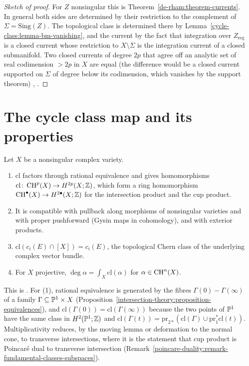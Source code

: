 \begin{proof}[Sketch of proof]
For $Z$ nonsingular this is Theorem~\ref{de-rham:theorem-currents}. In general both sides are determined by their restriction to the complement of $\Sigma = \mathrm{Sing}(Z)$. The
topological class is determined there by Lemma~\ref{cycle-class:lemma-bm-vanishing}, and the current by the fact that integration over $Z_{\mathrm{reg}}$ is a closed current whose
restriction to $X \setminus \Sigma$ is the integration current of a closed submanifold. Two closed currents of degree $2p$ that agree off an analytic set of real codimension
$> 2p$ in $X$ are equal (the difference would be a closed current supported on $\Sigma$ of degree below its codimension, which vanishes by the support theorem) \cite[Chapter 3]{griffiths-harris},
\cite[Section 11.1]{voisin-hodge-1}.
\end{proof}

\section{The cycle class map and its properties}\label{cycle-class:section-properties}

\begin{theorem}\label{cycle-class:theorem-cycle-class}
Let $X$ be a nonsingular complex variety.
\begin{enumerate}
\item $\mathrm{cl}$ factors through rational equivalence and gives homomorphisms $\mathrm{cl} \colon \operatorname{CH}^p(X) \to H^{2p}(X; \mathbb{Z})$, which form a ring homomorphism
$\operatorname{CH}^\bullet(X) \to H^{2\bullet}(X; \mathbb{Z})$ for the intersection product and the cup product.
\item It is compatible with pullback along morphisms of nonsingular varieties and with proper pushforward (Gysin maps in cohomology), and with exterior products.
\item $\mathrm{cl}(c_i(E) \cap [X]) = c_i(E)$, the topological Chern class of the underlying complex vector bundle.
\item For $X$ projective, $\deg\alpha = \int_X\mathrm{cl}(\alpha)$ for $\alpha \in \operatorname{CH}^n(X)$.
\end{enumerate}
\end{theorem}

This is \cite[Chapter 19]{fulton-intersection}. For (1), rational equivalence is generated by the fibres $\Gamma(0) - \Gamma(\infty)$ of a family
$\Gamma \subseteq \mathbb{P}^1 \times X$ (Proposition~\ref{intersection-theory:proposition-equivalences}), and $\mathrm{cl}(\Gamma(0)) = \mathrm{cl}(\Gamma(\infty))$ because the two points of $\mathbb{P}^1$
have the same class in $H^2(\mathbb{P}^1; \mathbb{Z})$ and $\mathrm{cl}(\Gamma(t)) = \mathrm{pr}_{2*}(\mathrm{cl}(\Gamma) \cup \mathrm{pr}_1^*\mathrm{cl}(t))$. Multiplicativity reduces, by the moving lemma or
deformation to the normal cone, to transverse intersections, where it is the statement that cup product is Poincar\'e dual to transverse intersection
(Remark~\ref{poincare-duality:remark-fundamental-classes-subspaces}).


